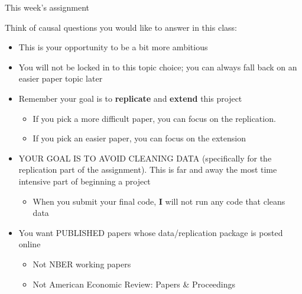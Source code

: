 \documentclass[compress, 8pt]{beamer}
\begin{document}
\begin{frame}{This week's assignment}

Think of causal questions you would like to answer in this class:

\begin{itemize}
    \item This is your opportunity to be a bit more ambitious 

    \vspace{1ex}
    \item You will not be locked in to this topic choice; you can always fall back on an easier paper topic later

    \vspace{1ex}
    \item Remember your goal is to \textbf{replicate} and \textbf{extend} this project 
    \begin{itemize}
        \item If you pick a more difficult paper, you can focus on the replication. 
        \item If you pick an easier paper, you can focus on the extension
    \end{itemize}

    \vspace{1ex}
    \item YOUR GOAL IS TO AVOID CLEANING DATA (specifically for the replication part of the assignment). This is far and away the most time intensive part of beginning a project
    \begin{itemize}
        \item When you submit your final code, \textbf{I} will not run any code that cleans data
    \end{itemize}

    \vspace{1ex}
    \item You want PUBLISHED papers whose data/replication package is posted online
    \begin{itemize}
        \item Not NBER working papers
        \item Not American Economic Review: Papers \& Proceedings
    \end{itemize}
\end{itemize}

\end{frame}
\end{document}
